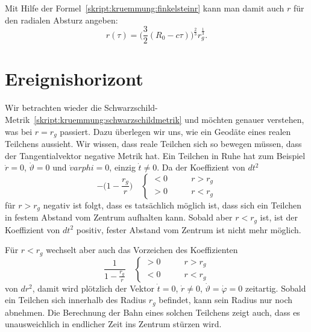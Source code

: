 Mit Hilfe der Formel~\eqref{skript:kruemmung:finkelsteinr}
kann man damit auch $r$ für den radialen Absturz angeben:
\[
r(\tau)=\biggl(\frac32(R_0-c\tau)\biggr)^{\frac23}r_g^{\frac13}.
\]

\section{Ereignishorizont%
\label{skript:section:ereignishorizont}}
Wir betrachten wieder die
Schwarzschild-Metrik~\eqref{skript:kruemmung:schwarzschildmetrik}
und möchten genauer verstehen, was bei $r=r_g$ passiert.
Dazu überlegen wir uns, wie ein Geodäte eines realen Teilchens 
aussieht.
Wir wissen, dass reale Teilchen sich so bewegen müssen, dass der
Tangentialvektor negative Metrik hat.
Ein Teilchen in Ruhe hat zum Beispiel $\dot r=0$, $\dot \vartheta=0$ und
$\dot varphi=0$, einzig $\dot t\ne 0$.
Da der Koeffizient von $dt^2$
\[
-\biggl(1-\frac{r_g}{r}\biggr)
\quad
\begin{cases}
<0&\qquad r > r_g
\\
>0&\qquad r < r_g
\end{cases}
\]
für $r>r_g$
negativ ist folgt, dass es tatsächlich möglich ist, dass sich ein Teilchen
in festem Abstand vom Zentrum aufhalten kann.
Sobald aber $r<r_g$ ist, ist der Koeffizient von $dt^2$ positiv,
fester Abstand vom Zentrum ist nicht mehr möglich.

Für $r<r_g$ wechselt aber auch das Vorzeichen des Koeffizienten
\[
\frac1{\displaystyle1-\frac{r_g}{r}}
\quad
\begin{cases}
>0&\qquad r>r_g
\\
<0&\qquad r<r_g
\end{cases}
\]
von $dr^2$, damit wird plötzlich der Vektor $\dot t=0$, $\dot r\ne 0$,
$\dot\vartheta=\dot\varphi=0$ zeitartig.
Sobald ein Teilchen sich innerhalb des Radius $r_g$ befindet, kann
sein Radius nur noch abnehmen.
Die Berechnung der Bahn eines solchen Teilchens zeigt auch, dass
es unausweichlich in endlicher Zeit ins Zentrum stürzen wird.

